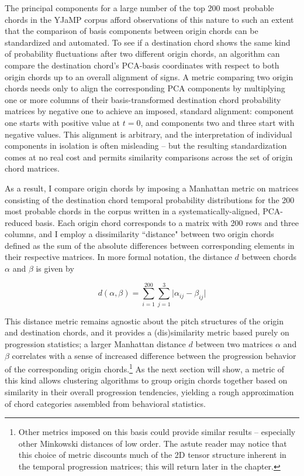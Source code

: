 The principal components for a large number of the top 200 most probable chords in the YJaMP corpus afford observations of this nature to such an extent that the comparison of basis components between origin chords can be standardized and automated.  To see if a destination chord shows the same kind of probability fluctuations after two different origin chords, an algorithm can compare the destination chord's PCA-basis coordinates with respect to both origin chords up to an overall alignment of signs.  A metric comparing two origin chords needs only to align the corresponding PCA components by multiplying one or more columns of their basis-transformed destination chord probability matrices by negative one to achieve an imposed, standard alignment: component one starts with positive value at $t=0$, and components two and three start with negative values.  This alignment is arbitrary, and the interpretation of individual components in isolation is often misleading -- but the resulting standardization comes at no real cost and permits similarity comparisons across the set of origin chord matrices.

As a result, I compare origin chords by imposing a Manhattan metric on matrices consisting of the destination chord temporal probability distributions for the 200 most probable chords in the corpus written in a systematically-aligned, PCA-reduced basis.  Each origin chord corresponds to a matrix with 200 rows and three columns, and I employ a dissimilarity ``distance" between two origin chords defined as the sum of the absolute differences between corresponding elements in their respective matrices.  In more formal notation, the distance $d$ between chords $\alpha$ and $\beta$ is given by

\begin{equation}
d(\alpha, \beta) = \sum_{i=1}^{200} \sum_{j=1}^3 \lvert \alpha_{ij} - \beta_{ij} \rvert
\end{equation}

This distance metric remains agnostic about the pitch structures of the origin and destination chords, and it provides a (dis)similarity metric based purely on progression statistics; a larger Manhattan distance $d$ between two matrices $\alpha$ and $\beta$ correlates with a sense of increased difference between the progression behavior of the corresponding origin chords.\footnote{Other metrics imposed on this basis could provide similar results -- especially other Minkowski distances of low order.  The astute reader may notice that this choice of metric discounts much of the 2D tensor structure inherent in the temporal progression matrices; this will return later in the chapter.} As the next section will show, a metric of this kind allows clustering algorithms to group origin chords together based on similarity in their overall progression tendencies, yielding a rough approximation of chord categories assembled from behavioral statistics.


